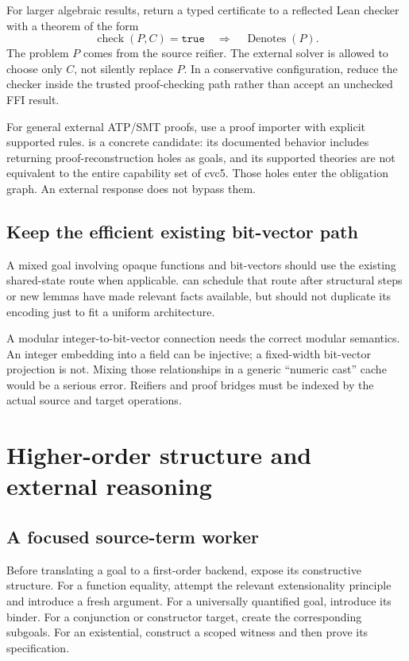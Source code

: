 For larger algebraic results, return a typed certificate to a reflected Lean
checker with a theorem of the form
\[
\operatorname{check}(P,C)=\texttt{true}
\quad\Longrightarrow\quad \operatorname{Denotes}(P).
\]
The problem $P$ comes from the source reifier. The external solver is allowed
to choose only $C$, not silently replace $P$. In a conservative configuration,
reduce the checker inside the trusted proof-checking path rather than accept
an unchecked FFI result.

For general external ATP/SMT proofs, use a proof importer with explicit
supported rules.  is a concrete candidate: its documented
behavior includes returning proof-reconstruction holes as goals, and its
supported theories are not equivalent to the entire capability set of cvc5.
\cite{leansmt} Those holes enter the obligation graph. An external
 response does not bypass them.

\subsection{Keep the efficient existing bit-vector path}

A mixed goal involving opaque functions and bit-vectors should use the
existing shared-state  route when applicable.
\Forge{} can schedule that route after structural steps or new lemmas have
made relevant facts available, but should not duplicate its encoding just to
fit a uniform architecture.\cite{release434}

A modular integer-to-bit-vector connection needs the correct modular
semantics. An integer embedding into a field can be injective; a fixed-width
bit-vector projection is not. Mixing those relationships in a generic
``numeric cast'' cache would be a serious error. Reifiers and proof bridges
must be indexed by the actual source and target operations.

\section{Higher-order structure and external reasoning}

\subsection{A focused source-term worker}

Before translating a goal to a first-order backend, expose its constructive
structure. For a function equality, attempt the relevant extensionality
principle and introduce a fresh argument. For a universally quantified goal,
introduce its binder. For a conjunction or constructor target, create the
corresponding subgoals. For an existential, construct a scoped witness and
then prove its specification.

